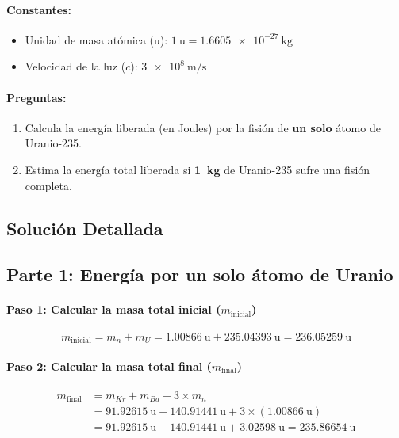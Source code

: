 \documentclass[11pt,a4paper]{book}
\begin{document}
\paragraph{Constantes:}
\begin{itemize}
    \item Unidad de masa atómica (u): $\SI{1}{\atomicmassunit} = \SI{1.6605e-27}{\kilo\gram}$
    \item Velocidad de la luz ($c$): $\SI{3e8}{\meter\per\second}$
\end{itemize}

\paragraph{Preguntas:}
\begin{enumerate}
    \item Calcula la energía liberada (en Joules) por la fisión de \textbf{un solo} átomo de Uranio-235.
    \item Estima la energía total liberada si \textbf{\SI{1}{\kilo\gram}} de Uranio-235 sufre una fisión completa.
\end{enumerate}

\subsection*{Solución Detallada}

\subsection*{Parte 1: Energía por un solo átomo de Uranio}

\paragraph{Paso 1: Calcular la masa total inicial ($m_{\text{inicial}}$)}
\[ m_{\text{inicial}} = m_n + m_U = \SI{1.00866}{\atomicmassunit} + \SI{235.04393}{\atomicmassunit} = \SI{236.05259}{\atomicmassunit} \]

\paragraph{Paso 2: Calcular la masa total final ($m_{\text{final}}$)}
\begin{align*}
    m_{\text{final}} &= m_{Kr} + m_{Ba} + 3 \times m_n \\
    &= \SI{91.92615}{\atomicmassunit} + \SI{140.91441}{\atomicmassunit} + 3 \times (\SI{1.00866}{\atomicmassunit}) \\
    &= \SI{91.92615}{\atomicmassunit} + \SI{140.91441}{\atomicmassunit} + \SI{3.02598}{\atomicmassunit} = \SI{235.86654}{\atomicmassunit}
\end{align*}
\end{document}

